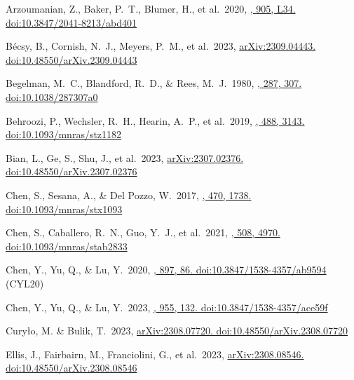 \documentclass[twocolumn]{aastex631}
\begin{document}
\begin{thebibliography}{0}
Arzoumanian, Z., Baker, P.~T., Blumer, H., et al.\ 2020, 
\href{https://ui.adsabs.harvard.edu/abs/2020ApJ...905L..34A}
{\apjl, 905, L34. doi:10.3847/2041-8213/abd401}

B{\'e}csy, B., Cornish, N.~J., Meyers, P.~M., et al.\ 2023, 
\href{https://ui.adsabs.harvard.edu/abs/2023arXiv230904443B}
{arXiv:2309.04443. doi:10.48550/arXiv.2309.04443}

Begelman, M.~C., Blandford, R.~D., \& Rees, M.~J.\ 1980, 
\href{https://ui.adsabs.harvard.edu/abs/1980Natur.287..307B}
{\nat, 287, 307. doi:10.1038/287307a0}

Behroozi, P., Wechsler, R.~H., Hearin, A.~P., et al.\ 2019, 
\href{https://ui.adsabs.harvard.edu/abs/2019MNRAS.488.3143B}
{\mnras, 488, 3143. doi:10.1093/mnras/stz1182}

Bian, L., Ge, S., Shu, J., et al.\ 2023, 
\href{https://ui.adsabs.harvard.edu/abs/2023arXiv230702376B}
{arXiv:2307.02376. doi:10.48550/arXiv.2307.02376}

Chen, S., Sesana, A., \& Del Pozzo, W.\ 2017, 
\href{https://ui.adsabs.harvard.edu/abs/2017MNRAS.470.1738C}
{\mnras, 470, 1738. doi:10.1093/mnras/stx1093}

Chen, S., Caballero, R.~N., Guo, Y.~J., et al.\ 2021, 
\href{https://ui.adsabs.harvard.edu/abs/2021MNRAS.508.4970C}
{\mnras, 508, 4970. doi:10.1093/mnras/stab2833}

Chen, Y., Yu, Q., \& Lu, Y.\ 2020, 
\href{https://ui.adsabs.harvard.edu/abs/2020ApJ...897...86C}
{\apj, 897, 86. doi:10.3847/1538-4357/ab9594} (CYL20)

Chen, Y., Yu, Q., \& Lu, Y.\ 2023, 
\href{https://ui.adsabs.harvard.edu/abs/2023ApJ...955..132C}
{\apj, 955, 132. doi:10.3847/1538-4357/ace59f} 

Cury{\l}o, M. \& Bulik, T.\ 2023, 
\href{https://ui.adsabs.harvard.edu/abs/2023arXiv230807720C}
{arXiv:2308.07720. doi:10.48550/arXiv.2308.07720}

Ellis, J., Fairbairn, M., Franciolini, G., et al.\ 2023, 
\href{https://ui.adsabs.harvard.edu/abs/2023arXiv230808546E}
{arXiv:2308.08546. doi:10.48550/arXiv.2308.08546}


\end{thebibliography}
\end{document}
